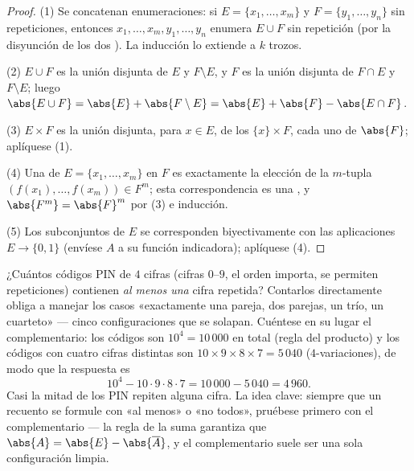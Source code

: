 \begin{proof}
(1) Se concatenan enumeraciones: si $E = \{x_1, \dots, x_m\}$ y
$F = \{y_1, \dots, y_n\}$ sin repeticiones, entonces $x_1, \dots, x_m,
y_1, \dots, y_n$ enumera $E \cup F$ sin repetición (por la
disyunción de los dos ). La inducción lo extiende a $k$
trozos.

(2) $E \cup F$ es la unión disjunta de $E$ y $F \setminus E$, y $F$ es
la unión disjunta de $F \cap E$ y $F \setminus E$; luego
$\abs{E \cup F} = \abs{E} + \abs{F \setminus E} = \abs{E} + \abs{F} -
\abs{E \cap F}$.

(3) $E \times F$ es la unión disjunta, para $x \in E$, de los 
$\{x\} \times F$, cada uno de  $\abs{F}$; aplíquese (1).

(4) Una  de $E = \{x_1, \dots, x_m\}$ en $F$ es exactamente
la elección de la $m$-tupla $(f(x_1), \dots, f(x_m)) \in F^m$; esta
correspondencia es una , y $\abs{F^m} = \abs{F}^m$ por (3) e
inducción.

(5) Los subconjuntos de $E$ se corresponden biyectivamente con las
aplicaciones $E \to \{0, 1\}$ (envíese $A$ a su función indicadora);
aplíquese (4).
\end{proof}

\begin{example}\label{ex:b1:counting:complement}
¿Cuántos códigos PIN de $4$ cifras (cifras $0$--$9$, el orden importa,
se permiten repeticiones) contienen \emph{al menos una} cifra repetida?
Contarlos directamente obliga a manejar los casos «exactamente una
pareja, dos parejas, un trío, un cuarteto» --- cinco configuraciones
que se solapan. Cuéntese en su lugar el complementario: los códigos
son $10^4 = 10\,000$ en total (regla del producto) y los códigos con
cuatro cifras distintas son $10 \times 9 \times 8 \times 7 = 5\,040$
($4$-variaciones), de modo que la respuesta es
\[
10^4 - 10 \cdot 9 \cdot 8 \cdot 7 = 10\,000 - 5\,040 = 4\,960 .
\]
Casi la mitad de los PIN repiten alguna cifra. La idea clave: siempre
que un recuento se formule con «al menos» o «no todos», pruébese
primero con el complementario --- la regla de la suma garantiza que
$\abs{A} = \abs{E} - \abs{\overline A}$, y el complementario suele ser
una sola configuración limpia.
\end{example}

